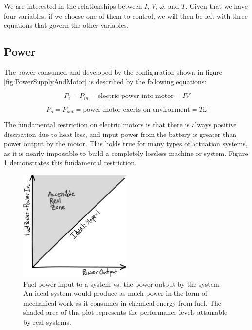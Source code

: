 We are interested in the relationships between $I$, $V$, $\omega$, and $T$. Given that we have four variables, if we choose one of them to control, we will then be left with three equations that govern the other variables.

\subsection*{Power}
\label{sec:Power}

The power consumed and developed by the configuration shown in figure \ref{fig:PowerSupplyAndMotor} is described by the following equations:

\begin{equation}
P_{i}=P_{in} = \mbox{electric power into motor}= IV
\label{eq:PowerIn}
\end{equation}

\begin{equation}
P_{o}=P_{out} = \mbox{power motor exerts on environment} = T\omega
\label{eq:PowerOut}
\end{equation}

The fundamental restriction on electric motors is that there is always positive dissipation due to heat loss, and input power from the battery is greater than power output by the motor. This holds true for many types of actuation systems, as it is nearly impossible to build a completely lossless machine or system. Figure \ref{fig:IdealPowerPlotSketch} demonstrates this fundamental restriction.

\begin{figure}[h]		%
\begin{centering}
\includegraphics[width=0.5\textwidth]{Figures/IdealPowerPlotSketch}\par
\end{centering}
\caption[Plot: Power Conservation]{Fuel power input to a system vs. the power output by the system. An ideal system would produce as much power in the form of mechanical work as it consumes in chemical energy from fuel. The shaded area of this plot represents the performance levels attainable by real systems.}
\label{fig:IdealPowerPlotSketch}
\end{figure}

